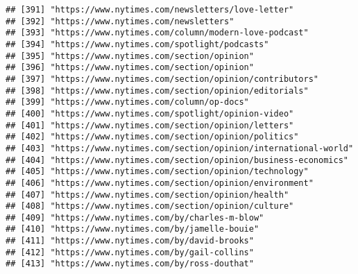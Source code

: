 \documentclass[
]{article}
\begin{document}
\begin{verbatim}
## [391] "https://www.nytimes.com/newsletters/love-letter"                                                           
## [392] "https://www.nytimes.com/newsletters"                                                                       
## [393] "https://www.nytimes.com/column/modern-love-podcast"                                                        
## [394] "https://www.nytimes.com/spotlight/podcasts"                                                                
## [395] "https://www.nytimes.com/section/opinion"                                                                   
## [396] "https://www.nytimes.com/section/opinion"                                                                   
## [397] "https://www.nytimes.com/section/opinion/contributors"                                                      
## [398] "https://www.nytimes.com/section/opinion/editorials"                                                        
## [399] "https://www.nytimes.com/column/op-docs"                                                                    
## [400] "https://www.nytimes.com/spotlight/opinion-video"                                                           
## [401] "https://www.nytimes.com/section/opinion/letters"                                                           
## [402] "https://www.nytimes.com/section/opinion/politics"                                                          
## [403] "https://www.nytimes.com/section/opinion/international-world"                                               
## [404] "https://www.nytimes.com/section/opinion/business-economics"                                                
## [405] "https://www.nytimes.com/section/opinion/technology"                                                        
## [406] "https://www.nytimes.com/section/opinion/environment"                                                       
## [407] "https://www.nytimes.com/section/opinion/health"                                                            
## [408] "https://www.nytimes.com/section/opinion/culture"                                                           
## [409] "https://www.nytimes.com/by/charles-m-blow"                                                                 
## [410] "https://www.nytimes.com/by/jamelle-bouie"                                                                  
## [411] "https://www.nytimes.com/by/david-brooks"                                                                   
## [412] "https://www.nytimes.com/by/gail-collins"                                                                   
## [413] "https://www.nytimes.com/by/ross-douthat"                                                                   

\end{verbatim}
\end{document}
